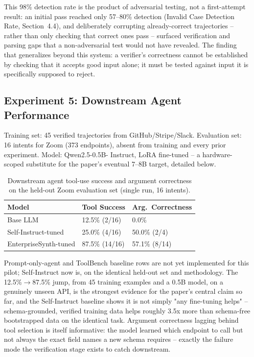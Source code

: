 \documentclass[letterpaper]{article} %
\begin{document}
This 98\% detection rate is the product of adversarial testing, not a first-attempt result: an
initial pass reached only 57--80\% detection (Invalid Case Detection Rate, Section~4.4), and
deliberately corrupting already-correct trajectories -- rather than only checking that correct
ones pass -- surfaced verification and parsing gaps that a non-adversarial test would not have
revealed. The finding that generalizes beyond this system: a verifier's correctness cannot be
established by checking that it accepts good input alone; it must be tested against input it is
specifically supposed to reject.

\subsection{Experiment 5: Downstream Agent Performance}
Training set: 45 verified trajectories from GitHub/Stripe/Slack. Evaluation set: 16 intents for
Zoom (373 endpoints), absent from training and every prior experiment. Model: Qwen2.5-0.5B-
Instruct, LoRA fine-tuned -- a hardware-scoped substitute for the paper's eventual 7--8B target,
detailed below.

\begin{table}[htbp]
\centering
\caption{Downstream agent tool-use success and argument correctness on the held-out Zoom
evaluation set (single run, 16 intents).}
\label{tab:downstream-zoom}
\begin{tabular}{lll}
\toprule
\textbf{Model} & \textbf{Tool Success} & \textbf{Arg.\ Correctness} \\
\midrule
Base LLM & 12.5\% (2/16) & 0.0\% \\
Self-Instruct-tuned & 25.0\% (4/16) & 50.0\% (2/4) \\
EnterpriseSynth-tuned & 87.5\% (14/16) & 57.1\% (8/14) \\
\bottomrule
\end{tabular}
\end{table}

Prompt-only-agent and ToolBench baseline rows are not yet implemented for this pilot; Self-Instruct
now is, on the identical held-out set and methodology. The 12.5\%$\rightarrow$87.5\% jump, from 45
training examples and a 0.5B model, on a genuinely unseen API, is the strongest evidence for the
paper's central claim so far, and the Self-Instruct baseline shows it is not simply "any
fine-tuning helps" -- schema-grounded, verified training data helps roughly 3.5x more than
schema-free bootstrapped data on the identical task. Argument correctness lagging behind tool
selection is itself informative: the model learned which endpoint to call but not always the
exact field names a new schema requires -- exactly the failure mode the verification stage exists
to catch downstream.
\end{document}
